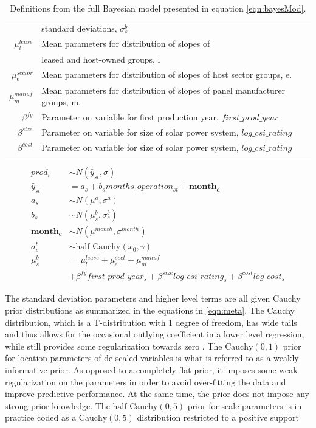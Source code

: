 \documentclass[a4paper]{article}
\begin{document}
\begin{table}
\begin{tabular}{rl}
    & standard deviations, $\sigma^b_s$\\
    $\mu_l^{lease}$ & Mean parameters for distribution of slopes of \\
    & leased and host-owned groups, l \\
    $\mu_e^{sector}$ & Mean parameters for distribution of slopes of host sector groups, e.\\
    $\mu_m^{manuf}$ & Mean parameters for distribution of slopes of panel manufacturer groups, m. \\
    $\beta^{fy} $ & Parameter on variable for first production year, $first\_prod\_year$\\
    $\beta^{size}$ & Parameter on variable for size of solar power system, $log\_csi\_rating$ \\
    $\beta^{cost}$ & Parameter on variable for size of solar power system, $log\_csi\_rating$ \\


  \bottomrule
  \end{tabular}

  \caption{Definitions from the full Bayesian model presented in equation \ref{eqn:bayesMod}. \label{tbl:definitions4p1}}
\end{table}


\begin{equation}
\begin{aligned}
prod_{i} &\sim N(\hat{y}_{st}, \sigma)\\ %
\hat{y}_{st} &= a_s + b_s months\_operation_{st} + \mathbf{month_c}\\
a_s &\sim N(\mu^a, \sigma^a)  \label{eqn:bayesMod} \\
b_s &\sim N(\mu_s^b, \sigma_s^b) \\
\mathbf{month_c} &\sim N(\mu^{month}, \sigma^{month})\\
\sigma_s^{b} &\sim \text{half-Cauchy}(x_0,\gamma) \\
\mu_{s}^{b} & = \mu^{lease}_l + \mu^{sect}_e + \mu^{manuf}_m  \\
& +\beta^{fy} first\_prod\_year_s + \beta^{size} log\_csi\_rating_s + \beta^{cost} log\_cost_s
\end{aligned}
\end{equation}

The standard deviation parameters and higher level terms are all given Cauchy prior distributions as summarized in the equations in \ref{eqn:meta}. The Cauchy distribution, which is a T-distribution with 1 degree of freedom, has wide tails and thus allows for the occasional outlying coefficient in a lower level regression, while still provides some regularization towards zero \citep{gelman_weakly_2008}. The $\text{Cauchy}(0,1)$ prior for location parameters of de-scaled variables is what is referred to as a weakly-informative prior. As opposed to a completely flat prior, it imposes some weak regularization on the parameters in order to avoid over-fitting the data and improve predictive performance. At the same time, the prior does not impose any strong prior knowledge. The $\text{half-Cauchy}(0,5)$ prior for scale parameters is in practice coded as a $\text{Cauchy}(0,5)$ distribution restricted to a positive support
\end{document}
